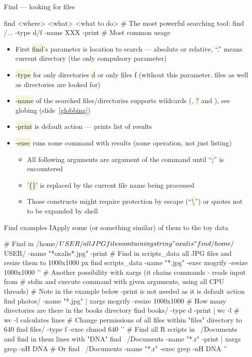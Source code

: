 \documentclass[compress, xelatex, 11pt, xcolor=svgnames, aspectratio=169,
	hyperref={
		bookmarks=true,
		unicode=true,
		colorlinks=true,
		pdftitle={Linux, command line and MetaCentrum},
		plainpages=false,
		pdfauthor={Vojtech Zeisek},
		pdfsubject={Course about use of Linux command line, writing shell scripts and using MetaCentrum of CESNET},
		pdfcreator={XeLaTeX},
		pdfkeywords={Linux, GNU, BASH, shell, command line, MetaCentrum},
		linkcolor=DarkRed, %
		anchorcolor=DarkBlue, %
		citecolor=Indigo, %
		filecolor=NavyBlue, %
		menucolor=DarkMagenta, %
		urlcolor=DarkBlue, %
		},
	url={hyphens, lowtilde} %
	]{beamer}
\renewcommand{\texttt}[1]{\colorbox{Beige}{{\ttfamily #1}}}
\begin{document}
\begin{frame}[fragile]{Find --- looking for files}
	\begin{bashcode}
    find <where> <what> <what to do> # The most powerful searching tool:
    find /... -type d/f -name XXX -print # Most common usage
	\end{bashcode}
	\begin{itemize}
		\item First \texttt{find}'s parameter is location to search --- absolute or relative, \enquote{\texttt{.}} means current directory (the only compulsory parameter)
		\item \texttt{-type} for only directories \texttt{d} or only files \texttt{f} (without this parameter, files as well as directories are looked for)
		\item \texttt{-name} of the searched files/directories supports wildcards (\texttt{*}, \texttt{?} and \texttt{[\ldots]}), see globing (slide~\ref{globbing})
		\item \texttt{-print} is default action --- prints list of results
		\item \texttt{-exec} runs some command with results (some operation, not just listing)
		\begin{itemize}
			\item All following arguments are argument of the command until \enquote{\texttt{;}} is encountered
			\item \texttt{'\{\}'} is replaced by the current file name being processed
			\item Those constructs might require protection by escape (\enquote{\texttt{\textbackslash}}) or quotes not to be expanded by shell
		\end{itemize}
	\end{itemize}
\end{frame}

\begin{frame}[fragile]{Find examples I}{Apply some (or something similar) of them to the toy data}
	\begin{bashcode}
    # Find in /home/$USER/ all JPG files containing string "oxalis"
    find /home/$USER/ -name "*oxalis*.jpg" -print
    # Find in scripts_data all JPG files and resize them to 1000x1000 px
    find scripts_data -name "*.jpg" -exec mogrify -resize 1000x1000 '{}' \;
    # Another possibility with xargs (it chains commands - reads input from
    # stdin and execute command with given arguments, using all CPU threads)
    # Note in the example below -print is not needed as it is default action
    find photos/ -name "*.jpg" | xargs mogrify -resize 1000x1000
    # How many directories are there in the books directory
    find books/ -type d -print | wc -l # wc -l calculates lines
    # Change permissions of all files within "files" directory to 640
    find files/ -type f -exec chmod 640 '{}' \;
    # Find all R scripts in ~/Documents and find in them lines with "DNA"
    find ~/Documents -name "*.r" -print | xargs grep -nH DNA # Or
    find ~/Documents -name "*.r" -exec grep -nH DNA '{}' \;
	\end{bashcode}
\end{frame}
\end{document}
